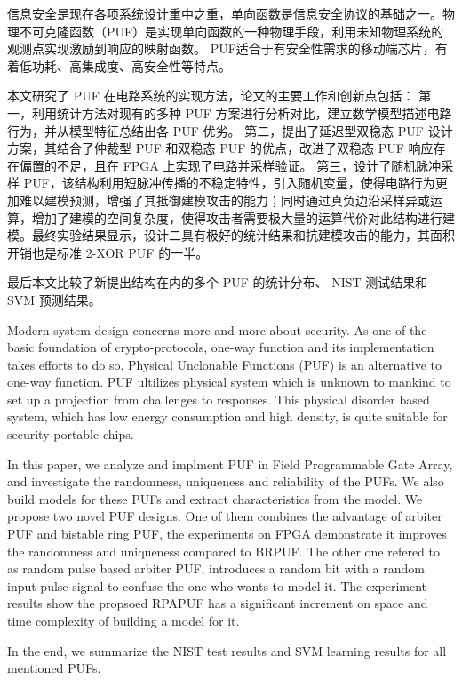 
\begin{cabstract}
信息安全是现在各项系统设计重中之重，单向函数是信息安全协议的基础之一。物理不可克隆函数（PUF）是实现单向函数的一种物理手段，利用未知物理系统的观测点实现激励到响应的映射函数。
PUF适合于有安全性需求的移动端芯片，有着低功耗、高集成度、高安全性等特点。

本文研究了 PUF 在电路系统的实现方法，论文的主要工作和创新点包括：
第一，利用统计方法对现有的多种 PUF 方案进行分析对比，建立数学模型描述电路行为，并从模型特征总结出各 PUF 优劣。
第二，提出了延迟型双稳态 PUF 设计方案，其结合了仲裁型 PUF 和双稳态 PUF 的优点，改进了双稳态 PUF 响应存在偏置的不足，且在 FPGA 上实现了电路并采样验证。
第三，设计了随机脉冲采样 PUF，该结构利用短脉冲传播的不稳定特性，引入随机变量，使得电路行为更加难以建模预测，增强了其抵御建模攻击的能力；同时通过真负边沿采样异或运算，增加了建模的空间复杂度，使得攻击者需要极大量的运算代价对此结构进行建模。最终实验结果显示，设计二具有极好的统计结果和抗建模攻击的能力，其面积开销也是标准 2-XOR PUF 的一半。

最后本文比较了新提出结构在内的多个 PUF 的统计分布、 NIST 测试结果和 SVM 预测结果。
	
\end{cabstract}

\begin{eabstract}
Modern system design concerns more and more about security. As one of the basic foundation of crypto-protocols, one-way function and its implementation takes efforts to do so. Physical Unclonable Functions (PUF) is an alternative to one-way function. PUF ultilizes physical system which is unknown to mankind to set up a projection from challenges to responses. This physical disorder based system, which has low energy consumption and high density, is quite suitable for security portable chips.

In this paper, we analyze and implment PUF in Field Programmable Gate Array, and investigate the randomness, uniqueness and reliability of the PUFs.
We also build models for these PUFs and extract characteristics from the model.
We propose two novel PUF designs. One of them combines the advantage of arbiter PUF and bistable ring PUF, the experiments on FPGA demonstrate it improves the randomness and uniqueness compared to BRPUF.
The other one refered to as random pulse based arbiter PUF, introduces a random bit with a random input pulse signal to confuse the one who wants to model it. The experiment results show the propsoed RPAPUF has a significant increment on space and time complexity of building a model for it.

In the end, we summarize the NIST test results and SVM learning results for all mentioned PUFs.

\end{eabstract}

